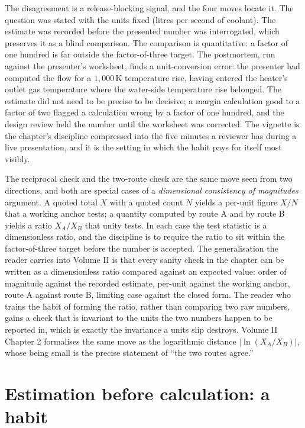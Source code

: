 The disagreement is a release-blocking signal, and the four moves
locate it. The question was stated with the units fixed (litres per
second of coolant). The estimate was recorded before the presented
number was interrogated, which preserves it as a blind comparison. The
comparison is quantitative: a factor of one hundred is far outside the
factor-of-three target. The postmortem, run against the presenter's
worksheet, finds a unit-conversion error: the presenter had computed
the flow for a $1{,}000 \,\si{\kelvin}$ temperature rise, having
entered the heater's outlet gas temperature where the water-side
temperature rise belonged. The estimate did not need to be precise to
be decisive; a margin calculation good to a factor of two flagged a
calculation wrong by a factor of one hundred, and the design review
held the number until the worksheet was corrected. The vignette is the
chapter's discipline compressed into the five minutes a reviewer has
during a live presentation, and it is the setting in which the habit
pays for itself most visibly.

\begin{mastery}
The reciprocal check and the two-route check are the same move seen
from two directions, and both are special cases of a
\emph{dimensional consistency of magnitudes} argument. A quoted total
$X$ with a quoted count $N$ yields a per-unit figure $X/N$ that a
working anchor tests; a quantity computed by route A and by route B
yields a ratio $X_{A}/X_{B}$ that unity tests. In each case the test
statistic is a dimensionless ratio, and the discipline is to require
the ratio to sit within the factor-of-three target before the number
is accepted. The generalisation the reader carries into Volume II is
that every sanity check in the chapter can be written as a
dimensionless ratio compared against an expected value: order of
magnitude against the recorded estimate, per-unit against the working
anchor, route A against route B, limiting case against the closed
form. The reader who trains the habit of forming the ratio, rather
than comparing two raw numbers, gains a check that is invariant to the
units the two numbers happen to be reported in, which is exactly the
invariance a units slip destroys. Volume II Chapter 2 formalises the
same move as the logarithmic distance $|\ln(X_{A}/X_{B})|$, whose
being small is the precise statement of ``the two routes agree.''
\end{mastery}

\section{Estimation before calculation: a habit}

